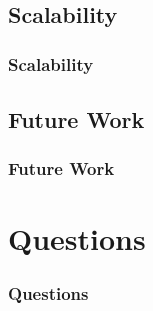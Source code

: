 \documentclass{beamer}
\begin{document}
\subsection{Scalability}
\begin{frame}
\frametitle{Scalability}
\end{frame}


\subsection{Future Work}
\begin{frame}
\frametitle{Future Work}
\end{frame}




\section{Questions}
\begin{frame}
\frametitle{Questions}
\begin{center}

\end{center}



\end{frame}

 
\end{document}
